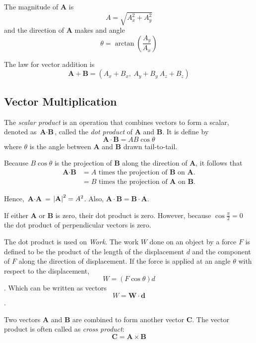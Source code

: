 \documentclass{article}
\begin{document}
{The magnitude of $\textbf{A}$ is
    \[A = \sqrt{A_x^2+A_y^2}\]
and the direction  of $\textbf{A}$ makes and angle 
    \[\theta =\arctan(\dfrac{A_y}{A_x})\]

The law for vector addition is 
\[ \textbf{A}+\textbf{B}=(A_x+B_x,\:A_y+B_y\:A_z+B_z) \]
\subsection{Vector Multiplication}
\begin{defi}
     The \emph{scalar product} is an operation that combines vectors to form a
     scalar, denoted as $\textbf{A}\cdot\textbf{B}$, called the \emph{dot product} of 
     $\textbf{A}$ and $\textbf{B}$. It is define by
    \[\textbf{A} \cdot \textbf{B} = AB\cos\theta\] where $\theta$ is the angle
    between $\textbf{A}$ and $\textbf{B}$ drawn tail-to-tail.

    Because $B\cos\theta$ is the projection of $\textbf{B}$ along the direction
of $\textbf{A}$, it follows that 
\begin{align*}
    \textbf{A} \cdot \textbf{B} &= A \text{ times the projection of } \textbf{B} \text{ on } \textbf{A}.\\
    &= B \text{ times the projection of } \textbf{A} \text{ on } \textbf{B}.
\end{align*}

Hence, $\textbf{A}\cdot \textbf{A}$ = $\left\lvert \textbf{A}\right\rvert^2 = A^2$. Also,
$\textbf{A} \cdot \textbf{B} = \textbf{B} \cdot \textbf{A}$. 

If either $\textbf{A}$ or $\textbf{B}$ is zero, their dot product is zero.
However, because $\cos\tfrac{\pi}{2}=0$ the dot product of perpendicular
vectors is zero.
\end{defi}

\begin{eg}
     The dot product is used on \emph{Work}. The work $W$ done
     on an object by a force $F$ is defined to be the product of the length
     of the displacement $d$ and the component of $F$ along the direction of
     displacement. If the force is applied at an angle $\theta$ with respect to the
     displacement, 
     \[W=(F\cos\theta)d\].
     Which can be written as vectors
     \[W = \textbf{W}\cdot \textbf{d}\].
\end{eg}
\begin{defi}
     Two vectors $\textbf{A}$ and $\textbf{B}$ are combined to form another vector
     $\textbf{C}$. The vector product is often called as \emph{cross product}:
     \[\textbf{C} = \textbf{A} \times \textbf{B}\]


\end{defi}}
\end{document}
